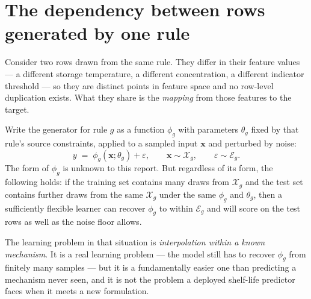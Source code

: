 

\section{The dependency between rows generated by one rule}

Consider two rows drawn from the same rule. They differ in their feature
values --- a different storage temperature, a different concentration, a
different indicator threshold --- so they are distinct points in feature
space and no row-level duplication exists. What they share is the
\emph{mapping} from those features to the target.

Write the generator for rule $g$ as a function $\phi_g$ with parameters
$\theta_g$ fixed by that rule's source constraints, applied to a sampled
input $\mathbf{x}$ and perturbed by noise:
\begin{equation}
y \;=\; \phi_g\!\left(\mathbf{x}; \theta_g\right) + \varepsilon,
\qquad \mathbf{x} \sim \mathcal{X}_g, \qquad \varepsilon \sim \mathcal{E}_g .
\label{eq:generator}
\end{equation}
The form of $\phi_g$ is unknown to this report. But regardless of its form,
the following holds: if the training set contains many draws from
$\mathcal{X}_g$ and the test set contains further draws from the same
$\mathcal{X}_g$ under the same $\phi_g$ and $\theta_g$, then a sufficiently
flexible learner can recover $\phi_g$ to within $\mathcal{E}_g$ and will
score on the test rows as well as the noise floor allows.

The learning problem in that situation is \emph{interpolation within a
known mechanism}. It is a real learning problem --- the model still has to
recover $\phi_g$ from finitely many samples --- but it is a fundamentally
easier one than predicting a mechanism never seen, and it is not the
problem a deployed shelf-life predictor faces when it meets a new
formulation.


